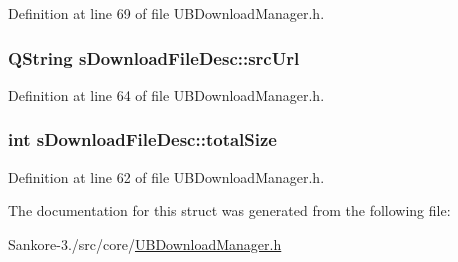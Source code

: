 Definition at line 69 of file U\-B\-Download\-Manager.\-h.

\hypertarget{structs_download_file_desc_a4a988f6add910812e0b8a5166ecb39d9}{
\subsubsection[{src\-Url}]{\setlength{\rightskip}{0pt plus 5cm}Q\-String s\-Download\-File\-Desc\-::src\-Url}}\label{d5/d15/structs_download_file_desc_a4a988f6add910812e0b8a5166ecb39d9}


Definition at line 64 of file U\-B\-Download\-Manager.\-h.

\hypertarget{structs_download_file_desc_a8edfff7d9fc9da8b982caf2bacbb9819}{
\subsubsection[{total\-Size}]{\setlength{\rightskip}{0pt plus 5cm}int s\-Download\-File\-Desc\-::total\-Size}}\label{d5/d15/structs_download_file_desc_a8edfff7d9fc9da8b982caf2bacbb9819}


Definition at line 62 of file U\-B\-Download\-Manager.\-h.



The documentation for this struct was generated from the following file\-:\begin{DoxyCompactItemize}
\item 
Sankore-\/3./src/core/\hyperlink{_u_b_download_manager_8h}{U\-B\-Download\-Manager.\-h}\end{DoxyCompactItemize}
